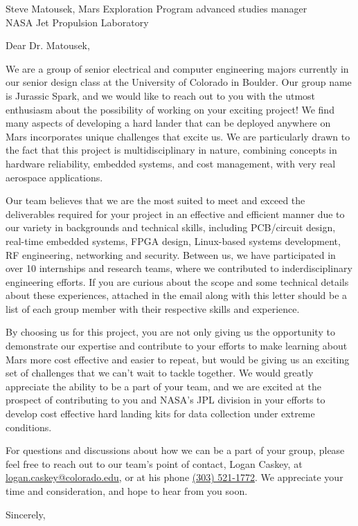 \documentclass{letter}
\begin{document}
\begin{letter}
{Steve Matousek, Mars Exploration Program advanced studies manager\\
NASA Jet Propulsion Laboratory
}

\opening{Dear Dr. Matousek,}

We are a group of senior electrical and computer engineering majors currently in our senior design class at the University of Colorado in Boulder. Our group name is Jurassic Spark, and we would like to reach out to you with the utmost enthusiasm about the possibility of working on your exciting project! We find many aspects of developing a hard lander that can be deployed anywhere on Mars incorporates unique challenges that excite us. We are particularly drawn to the fact that this project is multidisciplinary in nature, combining concepts in hardware reliability, embedded systems, and cost management, with very real aerospace applications. 

Our team believes that we are the most suited to meet and exceed the deliverables required for your project in an effective and efficient manner due to our variety in backgrounds and technical skills, including PCB/circuit design, real-time embedded systems, FPGA design, Linux-based systems development, RF engineering, networking and security. Between us, we have participated in over 10 internships and research teams, where we contributed to inderdisciplinary engineering efforts. If you are curious about the scope and some technical details about these experiences, attached in the email along with this letter should be a list of each group member with their respective skills and experience. 

By choosing us for this project, you are not only giving us the opportunity to demonstrate our expertise and contribute to your efforts to make learning about Mars more cost effective and easier to repeat, but would be giving us an exciting set of challenges that we can't wait to tackle together. We would greatly appreciate the ability to be a part of your team, and we are excited at the prospect of contributing to you and NASA's JPL division in your efforts to develop cost effective hard landing kits for data collection under extreme conditions. 

For questions and discussions about how we can be a part of your group, please feel free to reach out to our team's point of contact, Logan Caskey, at \href{mailto:logan.caskey@colorado.edu}{logan.caskey@colorado.edu}, or at his phone \href{tel:+13035211772}{(303) 521-1772}. We appreciate your time and consideration, and hope to hear from you soon.

\vspace{1em}

\closing{Sincerely,}

\end{letter}
\end{document}
